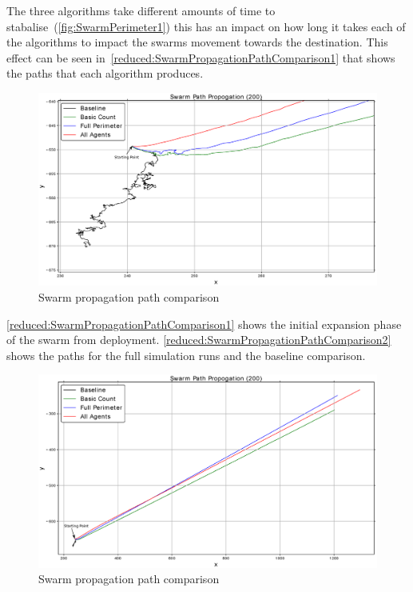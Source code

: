 The three algorithms take different amounts of time to stabalise~(\autoref{fig:SwarmPerimeter1}) this has an impact on how long it takes each of the algorithms to impact the swarms movement towards the destination. This effect can be seen in~\autoref{reduced:SwarmPropagationPathComparison1} that shows the paths that each algorithm produces. 

\begin{figure}[H]
\begin{center}
\includegraphics[width=14cm]{CHAPTER-6/figures/SwarmPropagationComparison1}
\end{center}
\caption{Swarm propagation path comparison\label{reduced:SwarmPropagationPathComparison1}}
\end{figure}

\autoref{reduced:SwarmPropagationPathComparison1} shows the initial expansion phase of the swarm from deployment. \autoref{reduced:SwarmPropagationPathComparison2} shows the paths for the full simulation runs and the baseline comparison.

\begin{figure}[H]
\begin{center}
\includegraphics[width=14cm]{CHAPTER-6/figures/SwarmPropagationComparison2}
\end{center}
\caption{Swarm propagation path comparison\label{reduced:SwarmPropagationPathComparison2}}
\end{figure}

